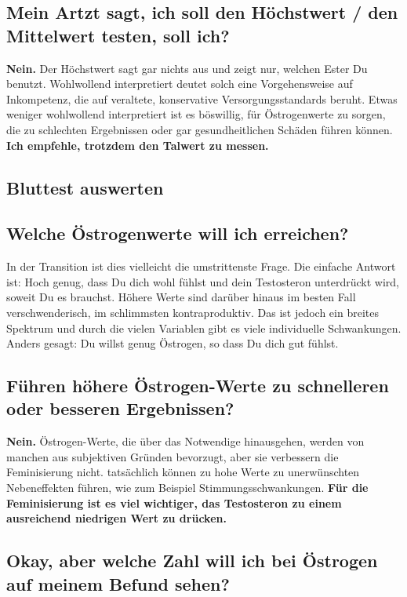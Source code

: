 \documentclass{article}
\begin{document}
{\subsection{Mein Artzt sagt, ich soll den Höchstwert / den Mittelwert testen, soll ich?}

\textbf{Nein.} Der Höchstwert sagt gar nichts aus und zeigt nur, welchen Ester Du benutzt. Wohlwollend interpretiert deutet solch eine Vorgehensweise auf Inkompetenz, die auf veraltete, konservative Versorgungsstandards beruht. Etwas weniger wohlwollend interpretiert ist es böswillig, für Östrogenwerte zu sorgen, die zu schlechten Ergebnissen oder gar gesundheitlichen Schäden führen können. \textbf{Ich empfehle, trotzdem den Talwert zu messen.}

\subsection*{Bluttest auswerten}

\subsection{Welche Östrogenwerte will ich erreichen?}

In der Transition ist dies vielleicht die umstrittenste Frage. Die einfache Antwort ist: Hoch genug, dass Du dich wohl fühlst und dein Testosteron unterdrückt wird, soweit Du es brauchst. Höhere Werte sind darüber hinaus im besten Fall verschwenderisch, im schlimmsten kontraproduktiv. Das ist jedoch ein breites Spektrum und durch die vielen Variablen gibt es viele individuelle Schwankungen. Anders gesagt: Du willst genug Östrogen, so dass Du dich gut fühlst.

\subsection{Führen höhere Östrogen-Werte zu schnelleren oder besseren Ergebnissen?}

\textbf{Nein.} Östrogen-Werte, die über das Notwendige hinausgehen, werden von manchen aus subjektiven Gründen bevorzugt, aber sie verbessern die Feminisierung nicht. tatsächlich können zu hohe Werte zu unerwünschten Nebeneffekten führen, wie zum Beispiel Stimmungsschwankungen. \textbf{Für die Feminisierung ist es viel wichtiger, das Testosteron zu einem ausreichend niedrigen Wert zu drücken.}

\subsection{Okay, aber welche Zahl will ich bei Östrogen auf meinem Befund sehen?}

}
\end{document}
